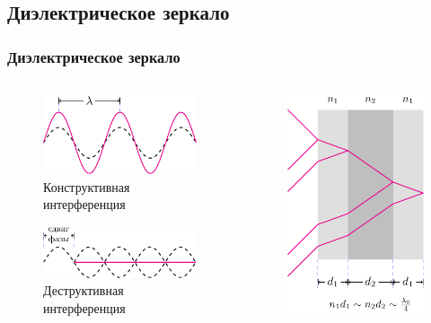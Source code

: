 \documentclass[10pt,pdf,hyperref={unicode}, dvipsnames]{beamer}
\newcommand\frametitless[1]{\subsection{#1}\frametitle{#1}}
\begin{document}
\begin{frame}[t]
	\frametitless{Диэлектрическое зеркало}
	\begin{columns}
		\begin{column}{0.49\textwidth}
			\begin{figure}[h]
				\centering
				\includegraphics[]{images/interf}
				\caption{Конструктивная интерференция}
			\end{figure}	
			\begin{figure}[h]
				\centering
				\includegraphics[]{images/interf2}
				\caption{Деструктивная интерференция}
			\end{figure}			
		\end{column}
		\begin{column}{0.49\textwidth}
			\begin{figure}[h]
				\centering
				\includegraphics[]{images/df}
			\end{figure}	
		\end{column}
	\end{columns}	
\end{frame}
\end{document}
